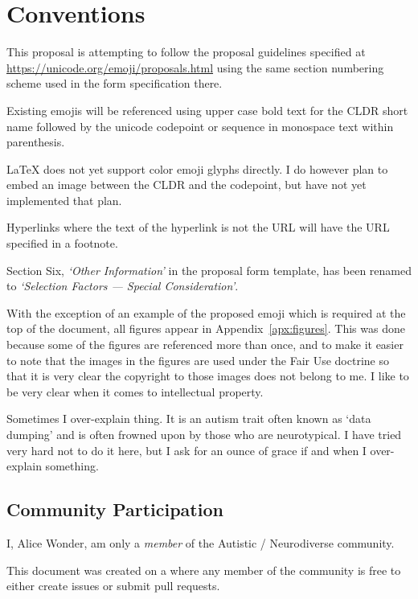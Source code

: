 \section*{Conventions}

This proposal is attempting to follow the proposal guidelines specified at
\url{https://unicode.org/emoji/proposals.html} using the same section numbering
scheme used in the form specification there.

Existing emojis will be referenced using upper case bold text for the CLDR short name
followed by the unicode codepoint or sequence in monospace text within parenthesis.

\LaTeX{} does not yet support color emoji glyphs directly. I do however plan to embed
an image between the CLDR and the codepoint, but have not yet implemented that plan.

Hyperlinks where the text of the hyperlink is not the URL will have the URL specified
in a footnote.

Section Six, \textit{`Other Information'} in the proposal form template, has been renamed to
\textit{`Selection Factors --- Special Consideration'}.

With the exception of an example of the proposed emoji which is required at the top of
the document, all figures appear in Appendix~\ref{apx:figures}. This was done because
some of the figures are referenced more than once, and to make it easier to note that
the images in the figures are used under the Fair Use doctrine so that it is very
clear the copyright to those images does not belong to me. I like to be very clear
when it comes to intellectual property.

Sometimes I over-explain thing. It is an autism trait often known as `data dumping' and
is often frowned upon by those who are neurotypical. I have tried very hard not to do
it here, but I ask for an ounce of grace if and when I over-explain something.

\subsection*{Community Participation}

I, Alice Wonder, am only a \emph{member} of the Autistic / Neurodiverse community.

This document was created on a
where any member of the community is free to either create issues or submit pull
requests.

